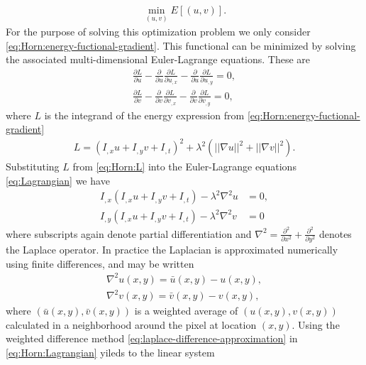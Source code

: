 \documentclass[letterpaper,12pt]{article}
\begin{document}
\begin{align}
\min_{(u,v)} E[(u,v)].
\label{eq:Horn:optimization}
\end{align}
For the purpose of solving this optimization problem we only consider \eqref{eq:Horn:energy-fuctional-gradient}. This functional can be minimized by solving the associated multi-dimensional Euler-Lagrange equations. These are
\begin{subequations}
\begin{align}
\frac{\partial L}{\partial u} - \frac{\partial}{\partial u}\frac{\partial L}{\partial u_{,x}} - \frac{\partial}{\partial u}\frac{\partial L}{\partial u_{,y}} = 0, \\
\frac{\partial L}{\partial v} - \frac{\partial}{\partial v}\frac{\partial L}{\partial v_{,x}} - \frac{\partial}{\partial v}\frac{\partial L}{\partial v_{,y}} = 0, 
\end{align}
\label{eq:Lagrangian}
\end{subequations}
where $L$ is the integrand of the energy expression from \eqref{eq:Horn:energy-fuctional-gradient}
\begin{align}
L = (I_{,x} u + I_{,y} v + I_{,t})^2 + \lambda^2 ( || \nabla u ||^2 + ||\nabla v|| ^2 ).
\label{eq:Horn:L}
\end{align}
Substituting $L$ from \eqref{eq:Horn:L} into the Euler-Lagrange equations \eqref{eq:Lagrangian} we have
\begin{subequations}
\begin{align}
I_{,x} (I_{,x} u + I_{,y} v + I_{,t}) - \lambda^2 \nabla^2 u &= 0, \\
I_{,y} (I_{,x} u + I_{,y} v + I_{,t}) - \lambda^2 \nabla^2 v &= 0
\end{align}
\label{eq:Horn:Lagrangian}
\end{subequations}
where subscripts again denote partial differentiation and $\nabla^2 = \frac{\partial^2}{\partial x^2} + \frac{\partial^2}{\partial y^2}$ denotes the Laplace operator. In practice the Laplacian is approximated numerically using finite differences, and may be written
\begin{subequations}
\begin{align}
\nabla^2 u(x,y) = \bar{u} (x,y) - u(x,y),\\
\nabla^2 v(x,y) = \bar{v} (x,y) - v(x,y),
\end{align}
\label{eq:laplace-difference-approximation}
\end{subequations}
where $(\bar{u}(x,y),\bar{v}(x,y))$ is a weighted average of $(u(x,y),v(x,y))$ calculated in a neighborhood around the pixel at location $(x,y)$. Using the weighted difference method \eqref{eq:laplace-difference-approximation} in \eqref{eq:Horn:Lagrangian} yileds to the linear system 
\end{document}
